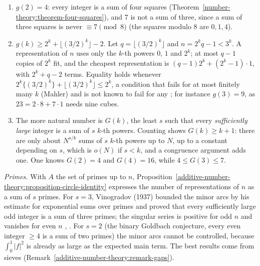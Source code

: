\begin{example}\label{additive-number-theory:example-waring}
\begin{enumerate}
\item $g(2) = 4$: every integer is a sum of four squares (Theorem~\ref{number-theory:theorem-four-squares}), and $7$ is not a sum of three, since a sum of three squares is never $\equiv 7 \pmod 8$ (the squares
modulo $8$ are $0, 1, 4$).
\item $g(k) \geq 2^k + \lfloor(3/2)^k\rfloor - 2$. Let $q = \lfloor(3/2)^k\rfloor$ and $n = 2^kq - 1 < 3^k$. A representation of $n$ uses only the $k$-th powers $0$, $1$ and $2^k$; at most $q - 1$ copies of $2^k$ fit, and the
cheapest representation is $(q - 1)2^k + (2^k - 1)\cdot1$, with $2^k + q - 2$ terms. Equality holds whenever $2^k\{(3/2)^k\} + \lfloor(3/2)^k\rfloor \leq 2^k$, a condition that fails for at most finitely many $k$ (Mahler) and is not known to fail for any \cite{vaughan-hardy-littlewood}; for instance $g(3) = 9$, as $23 = 2 \cdot 8 + 7 \cdot 1$ needs nine cubes.
\item The more natural number is $G(k)$, the least $s$ such that every \emph{sufficiently large} integer is a sum of $s$ $k$-th powers. Counting shows $G(k) \geq k + 1$: there are only about $N^{s/k}$ sums
of $s$ $k$-th powers up to $N$, up to a constant depending on $s$, which is $o(N)$ if $s < k$, and a congruence argument adds one. One knows $G(2) = 4$ and $G(4) = 16$, while $4 \leq G(3) \leq 7$.
\end{enumerate}
\end{example}

\begin{remark}\label{additive-number-theory:remark-goldbach}
\emph{Primes.} With $A$ the set of primes up to $n$, Proposition~\ref{additive-number-theory:proposition-circle-identity} expresses the number of representations of $n$ as a sum of $s$ primes. For $s = 3$,
Vinogradov (1937) bounded the minor arcs by his estimate for exponential sums over primes and proved that every sufficiently large odd integer is a sum of three primes; the singular series is
positive for odd $n$ and vanishes for even $n$ \cite{vaughan-hardy-littlewood}, \cite{iwaniec-kowalski}. For $s = 2$ (the binary Goldbach conjecture, every even integer $\geq 4$ is a sum of two primes) the
minor arcs cannot be controlled, because $\int_0^1|f|^2$ is already as large as the expected main term. The best results come from sieves (Remark~\ref{additive-number-theory:remark-gaps}).
\end{remark}

